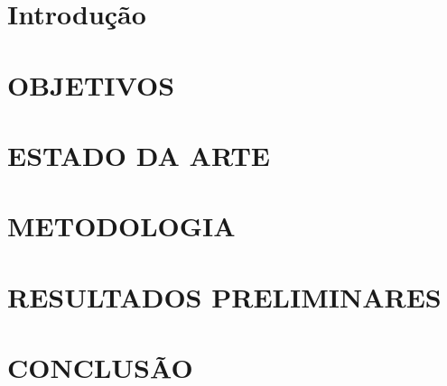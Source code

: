 \documentclass[
  a4paper,%
  12pt,%
  english,%
  brazilian,%
]{article}
\begin{document}





\section*{Introdução}%
\label{sect:intro}


\section*{OBJETIVOS} \label{sect:obj}



\section*{ESTADO DA ARTE} \label{sect:estadoarte}



\section*{METODOLOGIA} \label{sect:metodologia}



\section*{RESULTADOS PRELIMINARES}\label{sect:resultados}



\section*{CONCLUSÃO}\label{sect:conclusao}



\printbibliography

%

\end{document}
